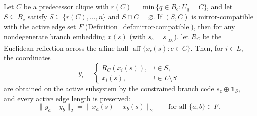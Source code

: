 \begin{lemma}
\label{lem:block-admissibility}
Let $C$ be a predecessor clique with $r(C)=\min\{q\in B_{\mathrm{c}}: U_q=C\}$, and let $S\subseteq B_{\mathrm{c}}$ satisfy $S\subseteq \{r(C),\ldots,n\}$ and $S\cap C=\varnothing.$ If $(S,C)$ is mirror-compatible with the active edge set $F$ (Definition~\ref{def:mirror-compatible}), then for any nondegenerate branch embedding $x(s)$ (with $s_{\mathrm{c}}=s|_{B_{\mathrm{c}}}$), let $R_C$ be the Euclidean reflection across the affine hull $\operatorname{aff}\{x_c(s) : c \in C\}$. Then, for $i \in L$, the coordinates
\[
y_i =
\begin{cases}
R_C(x_i(s)), & i\in S,\\
x_i(s), & i\in L\setminus S
\end{cases}
\]
are obtained on the active subsystem by the constrained branch code $s_{\mathrm{c}}\oplus \mathbf{1}_S$, and every active edge length is preserved:
\[
\|y_a-y_b\|_2=\|x_a(s)-x_b(s)\|_2
\qquad
\text{for all } \{a,b\}\in F.
\]
\end{lemma}

